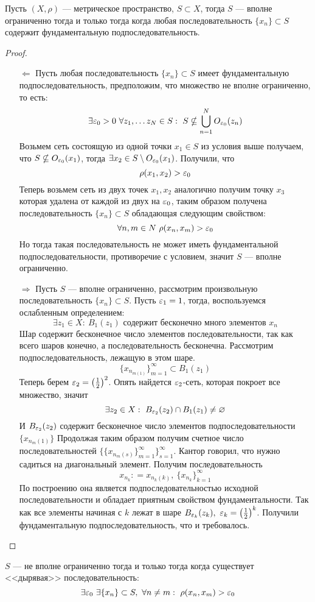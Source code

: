 \begin{claim}
	\label{claim:tbc}
	Пусть $(X, \rho)$ --- метрическое пространство, $S \subset X$, тогда $S$ --- вполне ограниченно тогда и только тогда когда любая последовательность $\{x_n\} \subset S$ содержит фундаментальную подпоследовательность.
\end{claim}
\begin{proof}
	\hfil
	\begin{enumerate}
		\item[$\Leftarrow$] Пусть любая последовательность $\{x_n\} \subset S$ имеет фундаментальную подпоследовательность, предположим, что множество не вполне ограниченно, то есть: 
		$$
		\exists \varepsilon_0 > 0 \ \forall z_1, \dots z_N \in S: \ S \nsubseteq \bigcup_{n=1}^NO_{\varepsilon_0}(z_n)
		$$
		Возьмем сеть состоящую из одной точки $x_1 \in S$ из условия выше получаем, что $S \nsubseteq O_{\varepsilon_0}(x_1)$, тогда $\exists x_2 \in S \setminus O_{\varepsilon_0}(x_1)$. Получили, что 
		$$
		\rho(x_1, x_2) > \varepsilon_0
		$$
		Теперь возьмем сеть из двух точек $x_1, x_2$ аналогично получим точку $x_3$ которая удалена от каждой из двух на $\varepsilon_0$, таким образом получена последовательность $\{x_n\} \subset S$ обладающая следующим свойством:
		$$
		\forall n,m \in N \ \rho(x_n, x_m) > \varepsilon_0
		$$
		Но тогда такая последовательность не может иметь фундаментальной подпоследовательности, противоречие с условием, значит $S$ --- вполне ограниченно.
		\item[$\Rightarrow$] Пусть $S$ --- вполне ограниченно, рассмотрим произвольную последовательность $\{x_n\} \subset S$. Пусть $\varepsilon_1 = 1$, тогда, воспользуемся ослабленным определением:
		$$
		\exists z_1 \in X: \ B_1(z_1) \text{ содержит бесконечно много элементов $x_n$}
		$$
		Шар содержит бесконечное число элементов последовательности, так как всего шаров конечно, а последовательность бесконечна. Рассмотрим подпоследовательность, лежащую в этом шаре. 
		$$
		\{x_{n_{m(1)}}\}_{m=1}^\infty \subset B_1(z_1)
		$$ 
		Теперь берем $\varepsilon_2  = \left(\frac{1}{2}\right)^2$. Опять найдется $\varepsilon_2$-сеть, которая покроет все множество, значит
		$$
		\exists z_2 \in X: \ B_{\eps_2}(z_2)\cap B_1(z_1) \neq \varnothing 
		$$
		И $B_{\varepsilon_2}(z_2)$ содержит бесконечное число элементов подпоследовательности $\{x_{n_m(1)}\}$
		Продолжая таким образом получим счетное число последовательностей $\{\{x_{n_m(s)}\}_{m=1}^\infty\}_{s=1}^\infty$. Кантор говорил, что  нужно садиться на диагональный элемент. Получим последовательность 
		$$
		x_{n_k} : = x_{n_k(k)}, \ \{x_{n_k}\}_{k=1}^\infty 
		$$
		По построению она является подпоследовательностью исходной последовательности и обладает приятным свойством фундаментальности. Так как все элементы начиная с $k$ лежат в шаре $B_{\varepsilon_k}(z_k), \ \varepsilon_k = \left(\frac{1}{2}\right)^k$. Получили фундаментальную подпоследовательность, что и требовалось.
	\end{enumerate}
\end{proof}
\begin{next0}
	$S$ --- не вполне ограниченно тогда и только тогда когда существует <<дырявая>> последовательность: 
	$$
	\exists \eps_0 \ \exists \{x_n\} \subset S, \ \forall n \neq m: \  \rho(x_n,x_m) > \eps_0
	$$
\end{next0}


